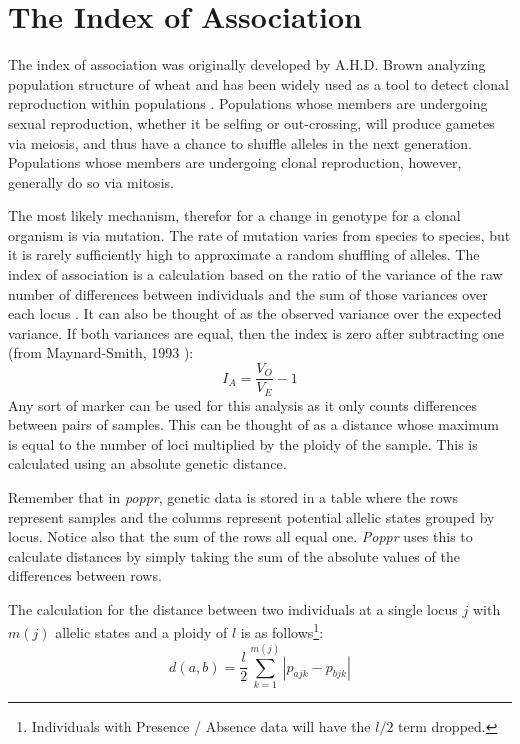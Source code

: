 \documentclass[letterpaper]{article}\usepackage[]{graphicx}\usepackage[]{color}
\newcommand{\poppr}{\textit{poppr}}
\newcommand{\Poppr}{\textit{Poppr}}
\begin{document}
\section{The Index of Association}
\label{indexassoc}

The index of association was originally developed by A.H.D. Brown analyzing
population structure of wheat and has been widely used as a tool to detect
clonal reproduction within populations \cite{Brown:1980, Smith:1993}.
Populations whose members are undergoing sexual reproduction, whether it be
selfing or out-crossing, will produce gametes via meiosis, and thus have a
chance to shuffle alleles in the next generation. Populations whose members are
undergoing clonal reproduction, however, generally do so via mitosis.

The most likely mechanism, therefor for a change in genotype for a clonal organism is via
mutation. The rate of mutation varies from species to species, but it is rarely
sufficiently high to approximate a random shuffling of alleles. The index of
association is a calculation based on the ratio of the variance of the raw
number of differences between individuals and the sum of those variances over
each locus \cite{Smith:1993}. It can also be thought of as the observed variance
over the expected variance. If both variances are equal, then the index is zero
after subtracting one (from Maynard-Smith, 1993 \cite{Smith:1993}):
\begin{equation}
\label{eq:I_A}
I_A = \frac{V_O}{V_E}-1
\end{equation}
Any sort of marker can be used for this analysis as it only counts differences
between pairs of samples. This can be thought of as a distance whose maximum is
equal to the number of loci multiplied by the ploidy of the sample. This is
calculated using an absolute genetic distance.

Remember that in \poppr{}, genetic data is stored in a table where the rows
represent samples and the columns represent potential allelic states grouped by
locus. Notice also that the sum of the rows all equal one. \Poppr{} uses this to
calculate distances by simply taking the sum of the absolute values of the
differences between rows.

The calculation for the distance between two individuals at a single locus $j$
with $m(j)$ allelic states and a ploidy of $l$ is as follows\footnote{Individuals
with Presence / Absence data will have the $l/2$ term dropped.}:
\begin{equation}
\label{eq:ia_d}
  d(a,b)=\frac{l}{2} \sum_{k=1}^{m(j)}
  |p_{ajk} - p_{bjk}|
\end{equation}
\end{document}
